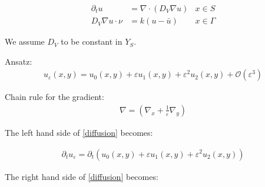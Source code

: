 \documentclass[10pt, a4paper]{article}
\begin{document}
 
 \begin{align}
 \partial_t u &= \nabla \cdot (D_V\nabla u)   & x\in S \label{diffusion}\\
 D_V\nabla u \cdot \nu &= k(u-\bar{u}) & x \in \Gamma \label{boundary condition}
 \end{align}
 
 We assume $D_V$ to be constant in $Y_S$.
 

 Ansatz:
\begin{align}
u_\varepsilon (x,y) = u_0(x,y) + \varepsilon u_1(x,y) + \varepsilon^2 u_2(x,y) + \mathcal{O} (\varepsilon^3)
\end{align}
 
 
 Chain rule for the gradient:
 \begin{align}
 \nabla = (\nabla_x + \frac{1}{\varepsilon} \nabla_y)
 \end{align}
 
 The left hand side of \eqref{diffusion} becomes:
 
 \begin{align}
 \partial_t u_\varepsilon =
 \partial_t \left( u_0(x,y) + \varepsilon u_1(x,y) + \varepsilon^2 u_2(x,y)\right)
 \end{align}
 
 The right hand side of \eqref{diffusion} becomes:
 
\end{document}
